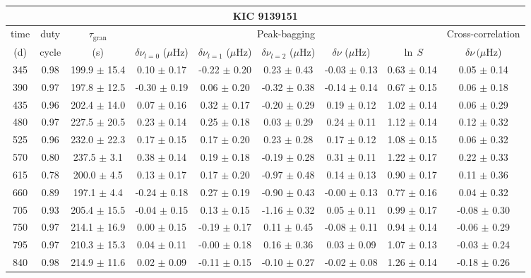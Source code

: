 \documentclass[twocolumn]{aastex61}%
\begin{document}
\begin{table}[ht]\centering\fontsize{9.}{7.}\selectfont
\begin{tabular}{ccc|ccccc|c}
\multicolumn{9}{c}{KIC 9139151}\\ \hline\hline
time & duty & $\tau_\text{gran}$ &\multicolumn{5}{c|}{Peak-bagging}&Cross-correlation\\
(d)& cycle & (s)&$\delta\nu_{l=0}$ ($\mu$Hz) & $\delta\nu_{l=1}$ ($\mu$Hz) & $\delta\nu_{l=2}$ ($\mu$Hz) & $\delta\nu$ ($\mu$Hz)& $\ln\,S$ & $\delta\nu\,(\mu$Hz)\\\hline
345 & 0.98 & 199.9 $\pm$ 15.4 & 0.10 $\pm$ 0.17 & -0.22 $\pm$ 0.20 & 0.23 $\pm$ 0.43 & -0.03 $\pm$ 0.13 & 0.63 $\pm$ 0.14 & 0.05 $\pm$ 0.14\\
390 & 0.97 & 197.8 $\pm$ 12.5 & -0.30 $\pm$ 0.19 & 0.06 $\pm$ 0.20 & -0.32 $\pm$ 0.38 & -0.14 $\pm$ 0.14 & 0.67 $\pm$ 0.15 & 0.06 $\pm$ 0.18\\
435 & 0.96 & 202.4 $\pm$ 14.0 & 0.07 $\pm$ 0.16 & 0.32 $\pm$ 0.17 & -0.20 $\pm$ 0.29 & 0.19 $\pm$ 0.12 & 1.02 $\pm$ 0.14 & 0.06 $\pm$ 0.29\\
480 & 0.97 & 227.5 $\pm$ 20.5 & 0.23 $\pm$ 0.14 & 0.25 $\pm$ 0.18 & 0.03 $\pm$ 0.29 & 0.24 $\pm$ 0.11 & 1.12 $\pm$ 0.14 & 0.12 $\pm$ 0.32\\
525 & 0.96 & 232.0 $\pm$ 22.3 & 0.17 $\pm$ 0.15 & 0.17 $\pm$ 0.20 & 0.23 $\pm$ 0.28 & 0.17 $\pm$ 0.12 & 1.08 $\pm$ 0.15 & 0.06 $\pm$ 0.32\\
570 & 0.80 & 237.5 $\pm$ 3.1 & 0.38 $\pm$ 0.14 & 0.19 $\pm$ 0.18 & -0.19 $\pm$ 0.28 & 0.31 $\pm$ 0.11 & 1.22 $\pm$ 0.17 & 0.22 $\pm$ 0.33\\
615 & 0.78 & 200.0 $\pm$ 4.5 & 0.13 $\pm$ 0.17 & 0.17 $\pm$ 0.20 & -0.97 $\pm$ 0.48 & 0.14 $\pm$ 0.13 & 0.90 $\pm$ 0.17 & 0.11 $\pm$ 0.36\\
660 & 0.89 & 197.1 $\pm$ 4.4 & -0.24 $\pm$ 0.18 & 0.27 $\pm$ 0.19 & -0.90 $\pm$ 0.43 & -0.00 $\pm$ 0.13 & 0.77 $\pm$ 0.16 & 0.04 $\pm$ 0.32\\
705 & 0.93 & 205.4 $\pm$ 15.5 & -0.04 $\pm$ 0.15 & 0.13 $\pm$ 0.15 & -1.16 $\pm$ 0.32 & 0.05 $\pm$ 0.11 & 0.99 $\pm$ 0.17 & -0.08 $\pm$ 0.30\\
750 & 0.97 & 214.1 $\pm$ 16.9 & 0.00 $\pm$ 0.15 & -0.19 $\pm$ 0.17 & 0.11 $\pm$ 0.45 & -0.08 $\pm$ 0.11 & 0.94 $\pm$ 0.14 & -0.06 $\pm$ 0.29\\
795 & 0.97 & 210.3 $\pm$ 15.3 & 0.04 $\pm$ 0.11 & -0.00 $\pm$ 0.18 & 0.16 $\pm$ 0.36 & 0.03 $\pm$ 0.09 & 1.07 $\pm$ 0.13 & -0.03 $\pm$ 0.24\\
840 & 0.98 & 214.9 $\pm$ 11.6 & 0.02 $\pm$ 0.09 & -0.11 $\pm$ 0.15 & -0.10 $\pm$ 0.27 & -0.02 $\pm$ 0.08 & 1.26 $\pm$ 0.14 & -0.18 $\pm$ 0.26\\

\end{tabular}
\end{table}
\end{document}
